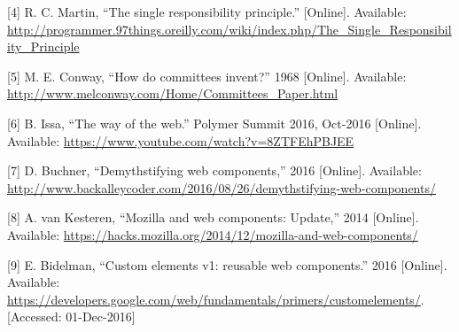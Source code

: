 \documentclass[]{assets/latex/ieee}
\begin{document}
\hypertarget{ref-Martin}{}
{[}4{]} R. C. Martin, ``The single responsibility principle.''
{[}Online{]}. Available:
\url{http://programmer.97things.oreilly.com/wiki/index.php/The_Single_Responsibility_Principle}

\hypertarget{ref-Conway1968}{}
{[}5{]} M. E. Conway, ``How do committees invent?'' 1968 {[}Online{]}.
Available: \url{http://www.melconway.com/Home/Committees_Paper.html}

\hypertarget{ref-Issa2016}{}
{[}6{]} B. Issa, ``The way of the web.'' Polymer Summit 2016, Oct-2016
{[}Online{]}. Available:
\url{https://www.youtube.com/watch?v=8ZTFEhPBJEE}

\hypertarget{ref-Buchner2016}{}
{[}7{]} D. Buchner, ``Demythstifying web components,'' 2016
{[}Online{]}. Available:
\url{http://www.backalleycoder.com/2016/08/26/demythstifying-web-components/}

\hypertarget{ref-vanKesteren2014}{}
{[}8{]} A. van Kesteren, ``Mozilla and web components: Update,'' 2014
{[}Online{]}. Available:
\url{https://hacks.mozilla.org/2014/12/mozilla-and-web-components/}

\hypertarget{ref-Bidelman2016}{}
{[}9{]} E. Bidelman, ``Custom elements v1: reusable web components.''
2016 {[}Online{]}. Available:
\url{https://developers.google.com/web/fundamentals/primers/customelements/}.
{[}Accessed: 01-Dec-2016{]}
\end{document}
